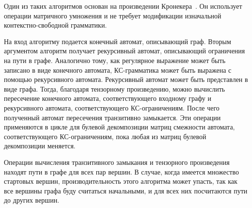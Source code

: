 Один из таких алгоритмов основан на произведении Кронекера~\cite{related_kron}. Он использует операции матричного умножения и не требует модификации изначальной контекстно-свободной грамматики.

На вход алгоритму подается конечный автомат, описывающий граф. Вторым аргументом алгоритм получает рекурсивный автомат, описывающий ограничения на пути в графе. Аналогично тому, как регулярное выражение может быть записано в виде конечного автомата, КС-грамматика может быть выражена с помощью рекурсивного автомата. Рекурсивный автомат может быть представлен в виде графа. Тогда, благодаря тензорному произведению, можно вычислить пересечение конечного автомата, соответствующего входному графу и рекурсивного автомата, соответствующего КС-ограничениям. После чего полученный автомат пересечения транзитивно замыкается. Эти операции применяются в цикле для булевой декомпозиции матриц смежности автомата, соответствующего КС-ограничениям, пока любая из матриц булевой декомпозиции меняется.

Операции вычисления транзитивного замыкания и тензорного произведения находят пути в графе для всех пар вершин. В случае, когда имеется множество стартовых вершин, производительность этого алгоритма может упасть, так как все вершины графа буду считаться начальными, и для всех них посчитаются пути до других вершин.
